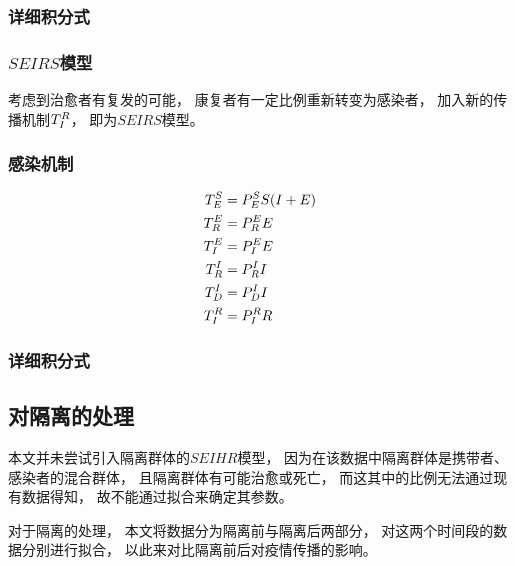 \subsubsection{详细积分式}
\SEIRD
\subsubsection{$SEIRS$模型}
\par 考虑到治愈者有复发的可能，
康复者有一定比例重新转变为感染者，
加入新的传播机制$T^{R}_{I}$，
即为$SEIRS$模型。
\subsubsection{感染机制}
\begin{align}
    T^{S}_{E}&=P^{S}_{E}S(I+E) \\
    T^{E}_{R}&=P^{E}_{R}E      \\
    T^{E}_{I}&=P^{E}_{I}E      \\
    T^{I}_{R}&=P^{I}_{R}I      \\
    T^{I}_{D}&=P^{I}_{D}I      \\
    T^{R}_{I}&=P^{R}_{I}R
\end{align}
\subsubsection{详细积分式}
\SEIRS
\subsection{对隔离的处理}
\par 本文并未尝试引入隔离群体的$SEIHR$模型，
因为在该数据中隔离群体是携带者、感染者的混合群体，
且隔离群体有可能治愈或死亡，
而这其中的比例无法通过现有数据得知，
故不能通过拟合来确定其参数。
\par 对于隔离的处理，
本文将数据分为隔离前与隔离后两部分，
对这两个时间段的数据分别进行拟合，
以此来对比隔离前后对疫情传播的影响。
